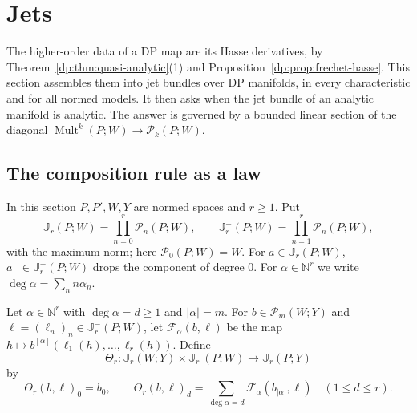 \documentclass[11pt]{amsart}
\theoremstyle{definition}
\theoremstyle{remark}
\numberwithin{equation}{section}
\newcommand{\N}{\mathbb N}
\newcommand{\Mult}{\operatorname{Mult}}
\newcommand{\abs}[1]{\lvert #1\rvert}
\theoremstyle{plain}
\theoremstyle{definition}
\theoremstyle{plain}
\newcommand{\cP}{\mathcal P}
\begin{document}
\section{Jets}\label{dp:sec:jets}

The higher-order data of a DP map are its Hasse derivatives, by Theorem~\ref{dp:thm:quasi-analytic}(1) and Proposition~\ref{dp:prop:frechet-hasse}. This section assembles them into jet bundles over DP manifolds, in every characteristic and for all normed models. It then asks when the jet bundle of an analytic manifold is analytic. The answer is governed by a bounded linear section of the diagonal $\Mult^k(P;W)\to\cP_k(P;W)$.

\subsection{The composition rule as a law}\label{dp:ssec:chain-law}

In this section $P,P',W,Y$ are normed spaces and $r\ge1$. Put
\[
 \mathbb J_r(P;W)=\prod_{n=0}^r\cP_n(P;W),\qquad \mathbb J^-_r(P;W)=\prod_{n=1}^r\cP_n(P;W),
\]
with the maximum norm; here $\cP_0(P;W)=W$. For $a\in\mathbb J_r(P;W)$, $a^-\in\mathbb J^-_r(P;W)$ drops the component of degree $0$. For $\alpha\in\N^r$ we write $\deg\alpha=\sum_nn\alpha_n$.

Let $\alpha\in\N^r$ with $\deg\alpha=d\ge1$ and $\abs\alpha=m$. For $b\in\cP_m(W;Y)$ and $\ell=(\ell_n)_n\in\mathbb J^-_r(P;W)$, let $\mathcal F_\alpha(b,\ell)$ be the map $h\mapsto b^{[\alpha]}(\ell_1(h),\dots,\ell_r(h))$. Define
\[
 \Theta_r\colon\mathbb J_r(W;Y)\times\mathbb J^-_r(P;W)\to\mathbb J_r(P;Y)
\]
by
\[
 \Theta_r(b,\ell)_0=b_0,\qquad\Theta_r(b,\ell)_d=\sum_{\deg\alpha=d}\mathcal F_\alpha(b_{\abs\alpha},\ell)\quad(1\le d\le r).
\]
\end{document}
